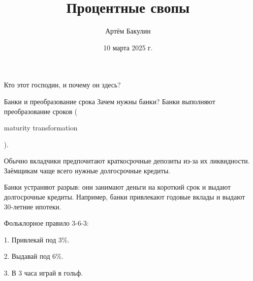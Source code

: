 \documentclass{beamer}
\title{Процентные свопы}
\author{Артём Бакулин}
\date{10 марта 2025 г.}
\newcommand{\en}[1]{\begin{otherlanguage}{english}#1\end{otherlanguage}}
\begin{document}
\begin{frame}
\titlepage
\end{frame}



\begin{frame}{Кто этот господин, и почему он здесь?}
\centering
{}
\end{frame}



\begin{frame}{Банки и преобразование срока}
\justify
Зачем нужны банки? Банки выполняют \alert{преобразование сроков} (\en{maturity transformation}).

\justify
Обычно вкладчики предпочитают краткосрочные депозиты из-за их ликвидности. Заёмщикам чаще всего нужные долгосрочные кредиты.

\justify
Банки устраняют разрыв: они занимают деньги на короткий срок и выдают долгосрочные кредиты. Например, банки привлекают годовые вклады и выдают 30-летние ипотеки.

\justify
Фольклорное правило 3-6-3:

1. Привлекай под 3\%.

2. Выдавай под 6\%.

3. В 3 часа играй в гольф.
\end{frame}
\end{document}
